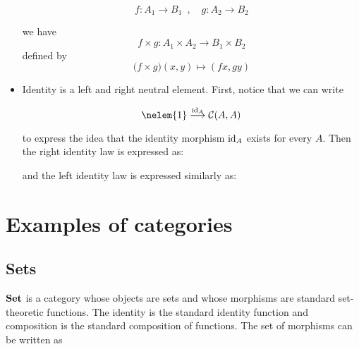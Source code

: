 \begin{definition}
\begin{itemize}
\begin{framed}
      \[f : A_1 \rightarrow B_1
        \enspace,\quad
        g : A_2 \rightarrow B_2\]

      we have
      \[f \times g : A_1 \times A_2 \rightarrow B_1 \times B_2\]
      defined by
      \[\big(f \times g\big)(x, y) \mapsto (f x, g y) \]
  \end{framed}

  \item Identity is a left and right neutral element. First, notice that we
    can write

    \[\nelem{1} \morpharr{\id A} \mathcal C(A, A)\]

    to express the idea that the identity morphism $\mathrm{id}_{ A }$ exists for every
    $A$.  Then the right identity law is expressed as:

    \begin{center}
  \end{center}

    and the left identity law is expressed similarly as:

    \begin{center}
  \end{center}
\end{itemize}

\end{definition}

\section{Examples of categories}

\subsection{Sets}

$\mathbf {Set}$ is a category whose objects are sets and whose morphisms are standard
set-theoretic functions. The identity is the standard identity function and
composition is the standard composition of functions. The set of morphisms can
be written as


